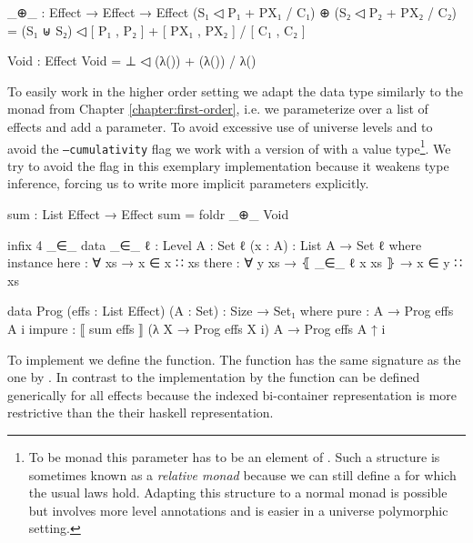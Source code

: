 \begin{code}
_⊕_ : Effect → Effect → Effect
(S₁ ◁ P₁ + PX₁ / C₁) ⊕ (S₂ ◁ P₂ + PX₂ / C₂) =
  (S₁ ⊎ S₂) ◁ [ P₁ , P₂ ] + [ PX₁ , PX₂ ] / [ C₁ , C₂ ]

Void : Effect
Void = ⊥ ◁ (λ()) + (λ()) / λ()
\end{code}
To easily work in the higher order setting we adapt the 
data type similarly to the  monad from Chapter
\ref{chapter:first-order}, i.e. we parameterize over a list of effects and add a
 parameter.
To avoid excessive use of universe levels and to avoid the \texttt{--cumulativity}
flag we work with a version of  with a
 value type\footnote{To be monad this parameter has to be an
  element of .
  Such a structure is sometimes known as a \textit{relative monad} because we
  can still define a \AgdaFunction{>>=} for which the usual laws hold.
  Adapting this structure to a normal monad is possible but involves more level
  annotations and is easier in a universe polymorphic setting.}.
We try to avoid the flag in this exemplary implementation because it weakens
type inference, forcing us to write more implicit parameters explicitly.

\begin{code}[hide]
sum : List Effect → Effect
sum = foldr _⊕_ Void

infix 4 _∈_
data _∈_ {ℓ : Level} {A : Set ℓ} (x : A) : List A → Set ℓ where
  instance
    here   : ∀ {xs} → x ∈ x ∷ xs
    there  : ∀ {y xs} → ⦃ _∈_ {ℓ} x xs ⦄ → x ∈ y ∷ xs
\end{code}
\begin{code}
data Prog (effs : List Effect) (A : Set) : {Size} → Set₁ where
  pure    : A → Prog effs A {i}
  impure  : ⟦ sum effs ⟧ (λ X → Prog effs X {i}) A → Prog effs A {↑ i}
\end{code}
To implement \AgdaFunction{>>=} we define the  function.
The function has the same signature as the one by
\textcite{DBLP:conf/haskell/WuSH14}.
In contrast to the implementation by \textcite{DBLP:conf/haskell/WuSH14} the
function can be defined generically for all effects because the indexed
bi-container representation is more restrictive than the their haskell
representation.

